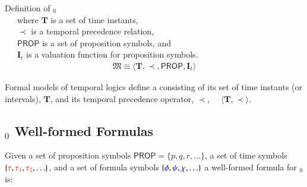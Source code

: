  \begin{definition} {Definition of \logicid$_0$} \\
~~~where $\mathbf{T}$ is a set of time instants, \\
~~~$\prec$ is a temporal precedence relation, \\
~~~$\mathsf{PROP}$ is a set of proposition symbols, and \\
~~~$\mathbf{I}_{t}$ is a valuation function for proposition symbols.
\begin{align}
\mathfrak{M} \equiv \langle \mathbf{T} , \prec , \mathsf{PROP} , \mathbf{I}_{t}
    \rangle\label{eq:df-bl.bl0}\tag{df-bl.bl0}
\end{align}
\end{definition}

 

\pn Formal models of temporal logics define a  consisting of its set of time instants (or intervals), $\mathbf{T}$,
 and its temporal precedence operator, $\prec$,~~  $ \langle \mathbf{T}, \prec \rangle$.  
 
% 

 
\subsection{\logicid$_0$ Well-formed Formulas}\label{sec:bl0wff}

\pn Given a set of proposition symbols $\mathsf{PROP} = \{ p, q, r, \ldots \}$, a set of time symbols $\{ \msc{\tau}, \msc{\tau_1}, \msc{\tau_2}, \ldots \}$, and a set of formula symbols
$\{ \mw{\phi}, \mw{\psi}, \mw{\chi}, \ldots \}$ a well-formed formula for \logicid$_0$ is:

